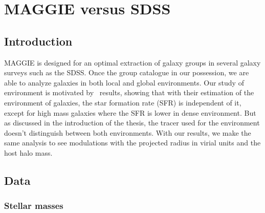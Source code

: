 \chapter[MAGGIE vs SDSS]{MAGGIE versus SDSS}
\label{cha:MAGGIE_vs_SDSS}

\minitoc%

\section{Introduction}
\label{sec:vs_introduction}

MAGGIE is designed for an optimal extraction of galaxy groups in several
galaxy surveys such as the SDSS\@. Once the group catalogue in our
possession, we are able to analyze galaxies in both local and global
environments. Our study of environment is motivated by~\cite{Peng+10}
results, showing that with their estimation of the environment of galaxies,
the star formation rate (SFR) is independent of it, except for high mass
galaxies where the SFR is lower in dense environment. But as discussed in
the introduction of the thesis, the tracer used for the environment doesn't
distinguish between both environments. With our results, we make the same
analysis to see modulations with the projected radius in virial units and
the host halo mass.

\section{Data}
\label{sec:data}

\subsection{Stellar masses}
\label{sub:stellar_masses}

